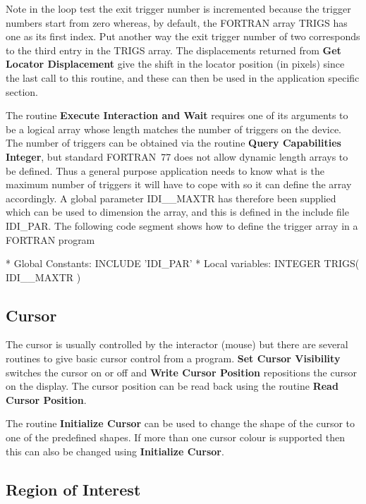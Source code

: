 \documentclass[11pt,nolof]{starlink}
\begin{document}
Note in the loop test the exit trigger number is incremented because
the trigger numbers start from zero whereas, by default, the FORTRAN
array TRIGS has one as its first index. Put another way the exit
trigger number of two corresponds to the third entry in the TRIGS array.
The displacements returned from \textbf{Get Locator Displacement} give the
shift in the locator position (in pixels) since the last call to this
routine, and these can then be used in the application specific section.

The routine \textbf{Execute Interaction and Wait} requires one of
its arguments to be a logical array whose length matches the number of
triggers on the device. The number of triggers can be obtained via the
routine \textbf{Query Capabilities Integer}, but standard FORTRAN~77 does not
allow dynamic length arrays to be defined. Thus a general purpose
application needs to know what is the maximum number of triggers it
will have to cope with so it can define the array accordingly. A global
parameter IDI\_\_MAXTR has therefore been supplied which can be used to
dimension the array, and this is defined in the include file IDI\_PAR.
The following code segment shows how to define the trigger array in a
FORTRAN program
\begin{small}
\begin{terminalv}
*  Global Constants:
      INCLUDE 'IDI_PAR'
*  Local variables:
      INTEGER TRIGS( IDI__MAXTR )
\end{terminalv}
\end{small}

\subsection{Cursor}

The cursor is usually controlled by the interactor (mouse) but there are
several routines to give basic cursor control from a program. \textbf{Set Cursor
Visibility} switches the cursor on or off and \textbf{Write Cursor Position}
repositions the cursor on the display. The cursor position can be read
back using the routine \textbf{Read Cursor Position}.

The routine \textbf{Initialize Cursor} can be used to change the shape of the
cursor to one of the predefined shapes. If more than one cursor colour is
supported then this can also be changed using \textbf{Initialize Cursor}.

\subsection{Region of Interest}
\end{document}
